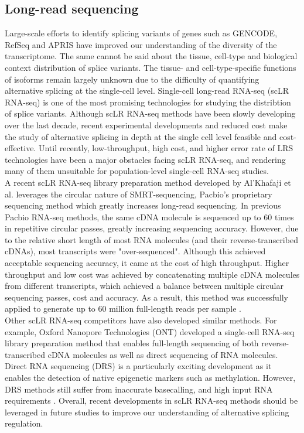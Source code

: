 \subsection{Long-read sequencing}
Large-scale efforts to identify splicing variants of genes such as GENCODE, RefSeq and APRIS have improved our understanding of the diversity of the transcriptome. The same cannot be said about the tissue, cell-type and biological context distribution of splice variants. The tissue- and cell-type-specific functions of isoforms remain largely unknown due to the difficulty of quantifying alternative splicing at the single-cell level. Single-cell long-read RNA-seq (scLR RNA-seq) is one of the most promising technologies for studying the distribtion of splice variants. Although scLR RNA-seq methods have been slowly developing over the last decade, recent experimental developments and reduced cost make the study of alternative splicing in depth at the single cell level feasible and cost-effective. Until recently, low-throughput, high cost, and higher error rate of LRS technologies have been a major obstacles facing scLR RNA-seq, and rendering many of them unsuitable for population-level single-cell RNA-seq studies. \\

A recent scLR RNA-seq library preparation method developed by Al'Khafaji et al. \cite{AlKhafaji2021-af} leverages the circular nature of SMRT-sequencing, Pacbio's proprietary sequencing method which greatly increases long-read sequencing. In previous Pacbio RNA-seq methods, the same cDNA molecule is sequenced up to 60 times in repetitive circular passes, greatly increasing sequencing accuracy. However, due to the relative short length of most RNA molecules (and their reverse-transcribed cDNAs), most transcripts were "over-sequenced". Although this achieved acceptable sequencing accuracy, it came at the cost of high throughput. Higher throughput and low cost was achieved by concatenating multiple cDNA molecules from different transcripts, which achieved a balance between multiple circular sequencing passes, cost and accuracy. As a result, this method was successfully applied to generate up to 60 million full-length reads per sample \cite{mas-seq-app-note,AlKhafaji2021-af}.\\

Other scLR RNA-seq competitors have also developed similar methods. For example, Oxford Nanopore Technologies (ONT) developed a single-cell RNA-seq library preparation method that enables full-length sequencing of both reverse-transcribed cDNA molecules as well as direct sequencing of RNA molecules. Direct RNA sequencing (DRS) is a particularly exciting development as it enables the detection of native epigenetic markers such as methylation. However, DRS methods still suffer from inaccurate basecalling, and high input RNA requirements \cite{Jain2022-sc}. Overall, recent developments in scLR RNA-seq methods should be leveraged in future studies to improve our understanding of alternative splicing regulation. 


